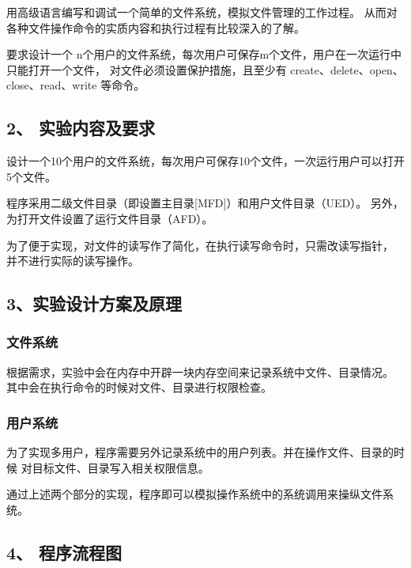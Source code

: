 \documentclass[12bp]{guo}
\begin{document}
用高级语言编写和调试一个简单的文件系统，模拟文件管理的工作过程。
从而对各种文件操作命令的实质内容和执行过程有比较深入的了解。


要求设计一个 n个用户的文件系统，每次用户可保存m个文件，用户在一次运行中只能打开一个文件，
对文件必须设置保护措施，且至少有 create、delete、open、close、read、write 等命令。

\subsection{2、 实验内容及要求}


设计一个10个用户的文件系统，每次用户可保存10个文件，一次运行用户可以打开5个文件。


程序采用二级文件目录（即设置主目录[MFD]）和用户文件目录（UED）。
另外，为打开文件设置了运行文件目录（AFD）。

  
为了便于实现，对文件的读写作了简化，在执行读写命令时，只需改读写指针，
并不进行实际的读写操作。


\subsection{3、实验设计方案及原理}

\subsubsection{文件系统}

根据需求，实验中会在内存中开辟一块内存空间来记录系统中文件、目录情况。
其中会在执行命令的时候对文件、目录进行权限检查。

\subsubsection{用户系统}

为了实现多用户，程序需要另外记录系统中的用户列表。并在操作文件、目录的时候
对目标文件、目录写入相关权限信息。


通过上述两个部分的实现，程序即可以模拟操作系统中的系统调用来操纵文件系统。

\clearpage

\subsection{4、 程序流程图}
\end{document}
